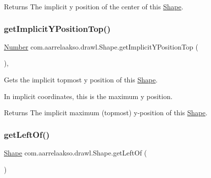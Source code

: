\begin{DoxyReturn}{Returns}
The implicit y position of the center of this \hyperlink{classcom_1_1aarrelaakso_1_1drawl_1_1_shape}{Shape}. 
\end{DoxyReturn}
\mbox{\label{classcom_1_1aarrelaakso_1_1drawl_1_1_shape_a6a52176302dd9b5d2bfc2d25409c310e}} 
\subsubsection{\texorpdfstring{get\+Implicit\+Y\+Position\+Top()}{getImplicitYPositionTop()}}
{\footnotesize\ttfamily \hyperlink{interfacecom_1_1aarrelaakso_1_1drawl_1_1_number}{Number} com.\+aarrelaakso.\+drawl.\+Shape.\+get\+Implicit\+Y\+Position\+Top (\begin{DoxyParamCaption}{ }\end{DoxyParamCaption})\hspace{0.3cm}{\ttfamily [protected]}, {\ttfamily [inherited]}}



Gets the implicit topmost y position of this \hyperlink{classcom_1_1aarrelaakso_1_1drawl_1_1_shape}{Shape}. 

In implicit coordinates, this is the maximum y position.

\begin{DoxyReturn}{Returns}
The implicit maximum (topmost) y-\/position of this \hyperlink{classcom_1_1aarrelaakso_1_1drawl_1_1_shape}{Shape}. 
\end{DoxyReturn}
\mbox{\label{classcom_1_1aarrelaakso_1_1drawl_1_1_shape_a2b19d5964ac46d545a7bae3133df6532}} 
\subsubsection{\texorpdfstring{get\+Left\+Of()}{getLeftOf()}}
{\footnotesize\ttfamily \hyperlink{classcom_1_1aarrelaakso_1_1drawl_1_1_shape}{Shape} com.\+aarrelaakso.\+drawl.\+Shape.\+get\+Left\+Of (\begin{DoxyParamCaption}{ }\end{DoxyParamCaption})\hspace{0.3cm}{\ttfamily [inherited]}}



